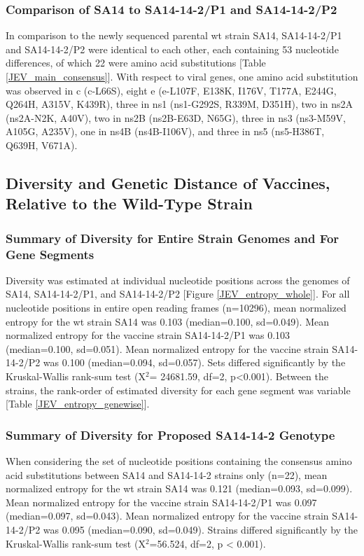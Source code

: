 \subsubsection{Comparison of SA14 to SA14-14-2/P1 and SA14-14-2/P2}
In comparison to the newly sequenced parental \gls{wt} strain SA14, SA14-14-2/P1 and SA14-14-2/P2 were identical to each other, each containing 53 nucleotide differences, of which 22 were amino acid substitutions [Table \ref{JEV_main_consensus}]. With respect to viral genes, one amino acid substitution was observed in \gls{c} (\gls{c}-L66S), eight \gls{e} (\gls{e}-L107F, E138K, I176V, T177A, E244G, Q264H, A315V, K439R), three in \gls{ns}1 (\gls{ns}1-G292S, R339M, D351H), two in \gls{ns}2A (\gls{ns}2A-N2K, A40V), two in \gls{ns}2B (\gls{ns}2B-E63D, N65G), three in \gls{ns}3 (\gls{ns}3-M59V, A105G, A235V), one in \gls{ns}4B (\gls{ns}4B-I106V), and three in \gls{ns}5 (\gls{ns}5-H386T, Q639H, V671A).
\subsection{Diversity and Genetic Distance of Vaccines, Relative to the Wild-Type Strain}
\subsubsection{Summary of Diversity for Entire Strain Genomes and For Gene Segments}
Diversity was estimated at individual nucleotide positions across the genomes of SA14, SA14-14-2/P1, and SA14-14-2/P2 [Figure \ref{JEV_entropy_whole}]. For all nucleotide positions in entire open reading frames (n=10296), mean normalized entropy for the \gls{wt} strain SA14 was 0.103 (median=0.100, \gls{sd}=0.049). Mean normalized entropy for the vaccine strain SA14-14-2/P1 was 0.103 (median=0.100, \gls{sd}=0.051). Mean normalized entropy for the vaccine strain SA14-14-2/P2 was 0.100 (median=0.094, \gls{sd}=0.057). Sets differed significantly by the Kruskal-Wallis rank-sum test (X$^2$= 24681.59, \gls{df}=2, p<0.001). Between the strains, the rank-order of estimated diversity for each gene segment was variable [Table \ref{JEV_entropy_genewise}].
\subsubsection{Summary of Diversity for Proposed SA14-14-2 Genotype}
When considering the set of nucleotide positions containing the consensus amino acid substitutions between SA14 and SA14-14-2 strains only (n=22), mean normalized entropy for the \gls{wt} strain SA14 was 0.121 (median=0.093, \gls{sd}=0.099). Mean normalized entropy for the vaccine strain SA14-14-2/P1 was 0.097 (median=0.097, \gls{sd}=0.043). Mean normalized entropy for the vaccine strain SA14-14-2/P2 was 0.095 (median=0.090, \gls{sd}=0.049). Strains differed significantly by the Kruskal-Wallis rank-sum test (X$^2$=56.524, \gls{df}=2,  p < 0.001).

